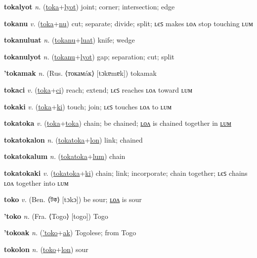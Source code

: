 \textbf{\hypertarget{tokalyot}{tokalyot}} \textit{n.} (\hyperlink{toka}{toka}+\allowbreak \hyperlink{lyot}{lyot})
joint; corner; intersection; edge

\textbf{\hypertarget{tokanu}{tokanu}} \textit{v.} (\hyperlink{toka}{toka}+\allowbreak \hyperlink{nu}{nu})
cut; separate; divide; split; ʟєꜱ makes ʟᴏᴧ stop touching ʟᴜᴍ

\textbf{\hypertarget{tokanuluat}{tokanuluat}} \textit{n.} (\hyperlink{tokanu}{tokanu}+\allowbreak \hyperlink{luat}{luat})
knife; wedge

\textbf{\hypertarget{tokanulyot}{tokanulyot}} \textit{n.} (\hyperlink{tokanu}{tokanu}+\allowbreak \hyperlink{lyot}{lyot})
gap; separation; cut; split

\textbf{\hypertarget{'tokamak}{'tokamak}} \textit{n.} (Rus. ⟨токамáк⟩ [tɔkɐmɐk])
tokamak

\textbf{\hypertarget{tokaci}{tokaci}} \textit{v.} (\hyperlink{toka}{toka}+\allowbreak \hyperlink{ci}{ci})
reach; extend; ʟєꜱ reaches ʟᴏᴧ toward ʟᴜᴍ

\textbf{\hypertarget{tokaki}{tokaki}} \textit{v.} (\hyperlink{toka}{toka}+\allowbreak \hyperlink{ki}{ki})
touch; join; ʟєꜱ touches ʟᴏᴧ to ʟᴜᴍ

\textbf{\hypertarget{tokatoka}{tokatoka}} \textit{v.} (\hyperlink{toka}{toka}+\allowbreak \hyperlink{toka}{toka})
chain; be chained; \hyperlink{tokatokalon}{ʟᴏᴧ} is chained together in \hyperlink{tokatokalum}{ʟᴜᴍ}

\textbf{\hypertarget{tokatokalon}{tokatokalon}} \textit{n.} (\hyperlink{tokatoka}{tokatoka}+\allowbreak \hyperlink{lon}{lon})
link; chained

\textbf{\hypertarget{tokatokalum}{tokatokalum}} \textit{n.} (\hyperlink{tokatoka}{tokatoka}+\allowbreak \hyperlink{lum}{lum})
chain

\textbf{\hypertarget{tokatokaki}{tokatokaki}} \textit{v.} (\hyperlink{tokatoka}{tokatoka}+\allowbreak \hyperlink{ki}{ki})
chain; link; incorporate; chain together; ʟєꜱ chains ʟᴏᴧ together into ʟᴜᴍ

\textbf{\hypertarget{toko}{toko}} \textit{v.} (Ben. ⟨{\bengali{}টক}⟩ [tɔkɔ])
be sour; \hyperlink{tokolon}{ʟᴏᴧ} is sour

\textbf{\hypertarget{'toko}{'toko}} \textit{n.} (Fra. ⟨Togo⟩ [togo])
Togo

\textbf{\hypertarget{'tokoak}{'tokoak}} \textit{n.} (\hyperlink{'toko}{'toko}+\allowbreak \hyperlink{ak}{ak})
Togolese; from Togo

\textbf{\hypertarget{tokolon}{tokolon}} \textit{n.} (\hyperlink{toko}{toko}+\allowbreak \hyperlink{lon}{lon})
sour

